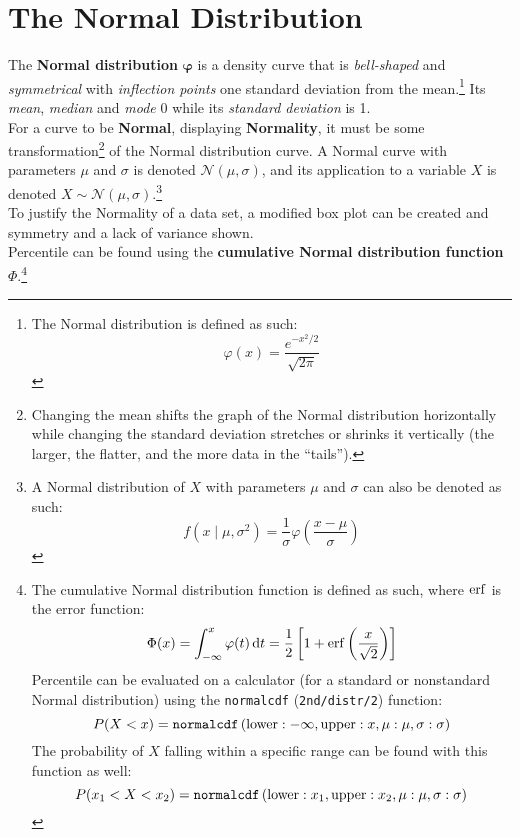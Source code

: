 \documentclass[../AP_Statistics.tex]{subfiles}
\begin{document}
		\section{The Normal Distribution}
			\begin{center}
			\end{center}
			The \textbf{Normal distribution} $\pmb{\varphi}$ is a density curve that is \emph{bell-shaped} and \emph{symmetrical} with \emph{inflection points} one standard deviation from the mean.\footnote{The Normal distribution is defined as such: \[\varphi(x) = \frac{e^{-x^2/2}}{\sqrt{2\pi}}\]} Its \emph{mean}, \emph{median} and \emph{mode} 0 while its \emph{standard deviation} is 1. \\
			For a curve to be \textbf{Normal}, displaying \textbf{Normality}, it must be some transformation\footnote{Changing the mean shifts the graph of the Normal distribution horizontally while changing the standard deviation stretches or shrinks it vertically (the larger, the flatter, and the more data in the \enquote{tails}).} of the Normal distribution curve. A Normal curve with parameters $\mu$ and $\sigma$ is denoted $\mathcal{N}(\mu, \sigma)$, and its application to a variable $X$ is denoted $X\sim\mathcal{N}(\mu,\sigma)$.\footnote{A Normal distribution of $X$ with parameters $\mu$ and $\sigma$ can also be denoted as such:\[f(x\mid\mu,\sigma^2) = \frac{1}{\sigma}\varphi\left(\frac{x - \mu}{\sigma}\right)\]} \\
			To justify the Normality of a data set, a modified box plot can be created and symmetry and a lack of variance shown. \\
			Percentile can be found using the \textbf{cumulative Normal distribution function} $\Phi$.\footnote{The cumulative Normal distribution function is defined as such, where $\operatorname{erf}$ is the error function:\[\Phi(x) = \int_{-\infty}^x\varphi(t)\,\mathrm{d} t = \frac{1}{2}\left[1 + \operatorname{erf}\left(\frac{x}{\sqrt{2}}\right)\right]\]Percentile can be evaluated on a calculator (for a standard or nonstandard Normal distribution) using the \texttt{normalcdf} (\texttt{2nd/distr/2}) function:\[P(X < x) = \operatorname{\texttt{normalcdf}}\left(\mathrm{lower}: -\infty, \mathrm{upper}: x, \mu: \mu, \sigma: \sigma\right)\]The probability of $X$ falling within a specific range can be found with this function as well:\[P(x_1 < X < x_2) = \operatorname{\texttt{normalcdf}}\left(\mathrm{lower}: x_1, \mathrm{upper}: x_2, \mu: \mu, \sigma: \sigma\right)\]}
\end{document}

